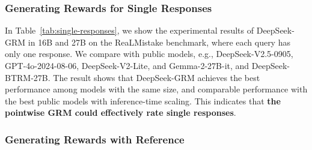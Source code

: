 \documentclass{article} %
\newcommand{\SGRM}{DeepSeek-GRM-27B\xspace}
\newcommand{\SGRMAll}{DeepSeek-GRM\xspace}
\newcommand{\SGRMSmall}{DeepSeek-GRM-16B\xspace}
\newcommand{\BTRM}{DeepSeek-BTRM\xspace}
\begin{document}
\subsubsection{Generating Rewards for Single Responses}


In Table~\ref{tab:single-responses}, we show the experimental results of \SGRMAll in 16B and 27B on the ReaLMistake benchmark, where each query has only one response. We compare with public models, e.g., DeepSeek-V2.5-0905, GPT-4o-2024-08-06, DeepSeek-V2-Lite, and Gemma-2-27B-it, and \BTRM-27B. The result shows that \SGRMAll achieves the best performance among models with the same size, and comparable performance with the best public models with inference-time scaling. 
This indicates that \textbf{the pointwise GRM could effectively rate single responses}. 

\subsubsection{Generating Rewards with Reference}\label{app:reference-rm}
\end{document}
